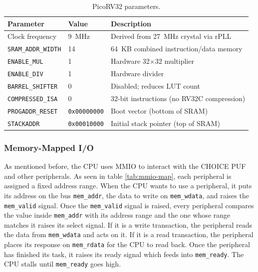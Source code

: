 \begin{table}[ht!]
\centering
\caption{PicoRV32 parameters.}
\begin{tabular}{lll}
\hline
\textbf{Parameter} & \textbf{Value} & \textbf{Description} \\
\hline
Clock frequency     & 9~MHz          & Derived from 27~MHz crystal via rPLL \\
\texttt{SRAM\_ADDR\_WIDTH} & 14      & 64~KB combined instruction/data memory \\
\texttt{ENABLE\_MUL}       & 1       & Hardware 32$\times$32 multiplier \\
\texttt{ENABLE\_DIV}       & 1       & Hardware divider \\
\texttt{BARREL\_SHIFTER}   & 0       & Disabled; reduces LUT count \\
\texttt{COMPRESSED\_ISA}& 0       & 32-bit instructions (no RV32C compression) \\
\texttt{PROGADDR\_RESET}   & \texttt{0x00000000} & Boot vector (bottom of SRAM) \\
\texttt{STACKADDR}         & \texttt{0x00010000} & Initial stack pointer (top of SRAM) \\
\hline
\end{tabular}
\label{tab:picorv32-params}
\end{table}

\subsubsection{Memory-Mapped I/O}
As mentioned before, the CPU uses MMIO to interact with the CHOICE PUF and other peripherals. As seen in table \ref{tab:mmio-map}, each peripheral is assigned a fixed address range. When the CPU wants to use a peripheral, it puts its address on the bus \verb|mem_addr|, the data to write on \verb|mem_wdata|, and raises the \verb|mem_valid| signal. Once the \verb|mem_valid| signal is raised, every peripheral compares the value inside \verb|mem_addr| with its address range and the one whose range matches it raises its select signal. If it is a write transaction, the peripheral reads the data from \verb|mem_wdata| and acts on it. If it is a read transaction, the peripheral places its response on \verb|mem_rdata| for the CPU to read back. Once the peripheral has finished its task, it raises its ready signal which feeds into \verb|mem_ready|. The CPU stalls until \verb|mem_ready| goes high. 

